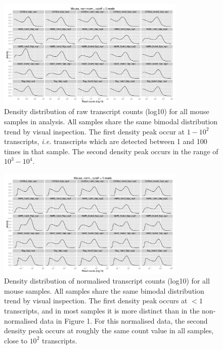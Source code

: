 \documentclass{article}
\begin{document}
\begin{figure}[h]
\begin{center}
\includegraphics[width=0.8\textwidth]{distributions_mouseNocutoff} %
\caption{Density distribution of raw transcript counts (log10) for all
  mouse samples in analysis. All samples share the same bimodal
  distribution trend by visual inspection. The first density peak
  occur at $1 - 10^2$ transcripts, \textit{i.e.} transcripts which are
  detected between 1 and 100 times in that sample. The second density
  peak occurs in the range of $10^3 - 10^4$.}
\end{center}
\end{figure}

\begin{figure}[h]
\begin{center}
\includegraphics[width=0.8\textwidth]{distributions_normmouseNocutoff} %
\caption{Density distribution of normalised transcript counts (log10)
  for all mouse samples. All samples share the same bimodal
  distribution trend by visual inspection. The first density peak
  occurs at $<1$ transcripts, and in most samples it is more distinct
  than in the non-normalised data in Figure 1. For this normalised
  data, the second density peak occurs at roughly the same count value
  in all samples, close to $10^2$ transcripts.}
\end{center}
\end{figure}
\end{document}
